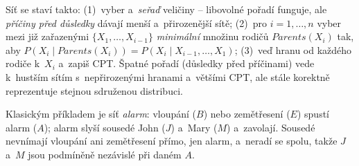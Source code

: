 \begin{poznamka}
Síť se staví takto: (1)~vyber a~\emph{seřaď} veličiny -- libovolné pořadí funguje, ale \emph{příčiny před důsledky} dávají menší a~přirozenější sítě; (2)~pro $i=1,\dots,n$ vyber mezi již zařazenými $\{X_1,\dots,X_{i-1}\}$ \emph{minimální} množinu rodičů $\mathit{Parents}(X_i)$ tak, aby $P(X_i\mid \mathit{Parents}(X_i))=P(X_i\mid X_{i-1},\dots,X_1)$; (3)~veď hranu od každého rodiče k~$X_i$ a~zapiš CPT. Špatné pořadí (důsledky před příčinami) vede k~hustším sítím s~nepřirozenými hranami a~většími CPT, ale stále korektně reprezentuje stejnou sdruženou distribuci.
\end{poznamka}

Klasickým příkladem je síť \emph{alarm}: vloupání ($B$) nebo zemětřesení ($E$) spustí alarm ($A$); alarm slyší sousedé John ($J$) a~Mary ($M$) a~zavolají. Sousedé nevnímají vloupání ani zemětřesení přímo, jen alarm, a~neradí se spolu, takže $J$ a~$M$ jsou podmíněně nezávislé při daném $A$.

